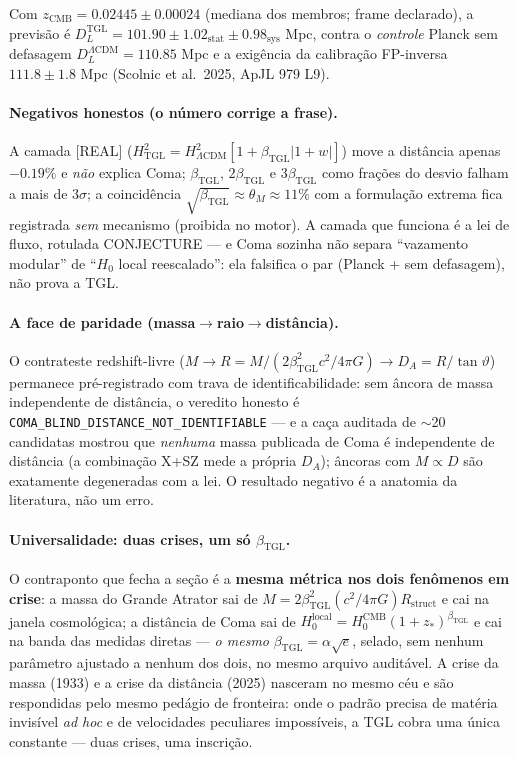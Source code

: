 \documentclass[11pt]{article}
\newcommand{\bTGL}{\beta_{\mathrm{TGL}}}\newcommand{\Msun}{M_{\odot}}\newcommand{\TGL}{\mathrm{TGL}}
\theoremstyle{definition}\newtheorem{deriv}{Derivação}
\begin{document}
Com $z_{\mathrm{CMB}}=0.02445\pm0.00024$ (mediana dos membros; frame declarado), a previsão é $D_L^{\mathrm{TGL}}=101.90\pm1.02_{\mathrm{stat}}\pm0.98_{\mathrm{sys}}$ Mpc, contra o \emph{controle} Planck sem defasagem $D_L^{\Lambda\mathrm{CDM}}=110.85$ Mpc e a exigência da calibração FP-inversa $111.8\pm1.8$ Mpc (Scolnic et al.\ 2025, ApJL 979 L9).

\paragraph{Negativos honestos (o número corrige a frase).} A camada [REAL] ($H^2_{\mathrm{TGL}}=H^2_{\Lambda\mathrm{CDM}}[1+\bTGL|1+w|]$) move a distância apenas $-0.19\%$ e \emph{não} explica Coma; $\bTGL$, $2\bTGL$ e $3\bTGL$ como frações do desvio falham a mais de $3\sigma$; a coincidência $\sqrt{\bTGL}\approx\theta_M\approx11\%$ com a formulação extrema fica registrada \emph{sem} mecanismo (proibida no motor). A camada que funciona é a lei de fluxo, rotulada \textsf{CONJECTURE} --- e Coma sozinha não separa ``vazamento modular'' de ``$H_0$ local reescalado'': ela falsifica o par (Planck + sem defasagem), não prova a TGL.

\paragraph{A face de paridade (massa$\to$raio$\to$distância).} O contrateste redshift-livre ($M\to R=M/(2\bTGL^2 c^2/4\pi G)\to D_A=R/\tan\vartheta$) permanece pré-registrado com trava de identificabilidade: sem âncora de massa independente de distância, o veredito honesto é \texttt{COMA\_BLIND\_DISTANCE\_NOT\_IDENTIFIABLE} --- e a caça auditada de $\sim$20 candidatas mostrou que \emph{nenhuma} massa publicada de Coma é independente de distância (a combinação X+SZ mede a própria $D_A$); âncoras com $M\propto D$ são exatamente degeneradas com a lei. O resultado negativo é a anatomia da literatura, não um erro.

\paragraph{Universalidade: duas crises, um só $\bTGL$.} O contraponto que fecha a seção é a \textbf{mesma métrica nos dois fenômenos em crise}: a massa do Grande Atrator sai de $M=2\bTGL^2(c^2/4\pi G)R_{\mathrm{struct}}$ e cai na janela cosmológica; a distância de Coma sai de $H_0^{\mathrm{local}}=H_0^{\mathrm{CMB}}(1+z_*)^{\bTGL}$ e cai na banda das medidas diretas --- \emph{o mesmo} $\bTGL=\alpha\sqrt e$, selado, sem nenhum parâmetro ajustado a nenhum dos dois, no mesmo arquivo auditável. A crise da massa (1933) e a crise da distância (2025) nasceram no mesmo céu e são respondidas pelo mesmo pedágio de fronteira: onde o padrão precisa de matéria invisível \emph{ad hoc} e de velocidades peculiares impossíveis, a TGL cobra uma única constante --- duas crises, uma inscrição.
\end{document}
